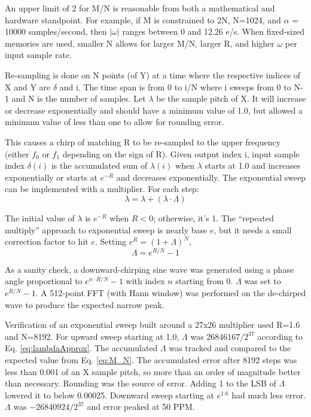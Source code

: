 An upper limit of 2 for M/N is reasonable from both a mathematical and
hardware standpoint. For example, if M is constrained to 2N, N=1024, and
$\alpha$ = 10000 samples/second, then $|\omega|$ ranges between 0 and 12.26 e/s.
When fixed-sized memories are used, smaller N allows for larger M/N, larger R,
and higher $\omega$ per input sample rate.

Re-sampling is done on N points (of Y) at a time where the respective indices of
X and Y are $\delta$ and i.
The time span is from 0 to i/N where i sweeps from 0 to N-1 and N is the number
of samples.
Let $\lambda$ be the sample pitch of X.
It will increase or decrease exponentially and should have a minimum value of
1.0, but allowed a minimum value of less than one to allow for rounding error.

This causes a chirp of matching R to be re-sampled to the upper frequency
(either $f_0$ or $f_1$ depending on the sign of R).
Given output index i, input sample index $\delta(i)$ is the accumulated sum of
$\lambda(i)$ when $\lambda$ starts at 1.0 and increases exponentially
or starts at $e^{-R}$ and decreases exponentially.
The exponential sweep can be implemented with a multiplier.
For each step:
\begin{equation}  \label{eq:lambda}
\lambda = \lambda + (\lambda\cdot\Lambda)
\end{equation}

The initial value of $\lambda$ is $e^{-R}$ when $R<0$; otherwise, it's 1.
The ``repeated multiply'' approach to exponential sweep is nearly base $e$,
but it needs a small correction factor to hit $e$.
Setting $e^R = (1 + \Lambda)^N$,
\begin{equation}  \label{eq:lambdaApprox}
\Lambda = e^{R/N} - 1
\end{equation}

As a sanity check, a downward-chirping sine wave was generated using a phase
angle proportional to $e^{n\cdot R/N} - 1$ with index $n$ starting from 0.
$\Lambda$ was set to $e^{R/N} - 1$.
A 512-point FFT (with Hann window) was performed on the de-chirped wave to
produce the expected narrow peak.

Verification of an exponential sweep built around a 27x26 multiplier used R=1.6
and N=8192. For upward sweep starting at 1.0, $\Lambda$ was $26846167/2^{37}$
according to Eq. \ref{eq:lambdaApprox}.
The accumulated $\Lambda$ was tracked and compared to the expected value from
Eq. \ref{eq:M_N}. The accumulated error after 8192 steps was less than 0.001
of an X sample pitch, so more than an order of magnitude better than necessary.
Rounding was the source of error.
Adding 1 to the LSB of $\Lambda$ lowered it to below 0.00025.
Downward sweep starting at $e^{1.6}$ had much less error.
$\Lambda$ was $-26840924/2^{37}$ and error peaked at 50 PPM.

